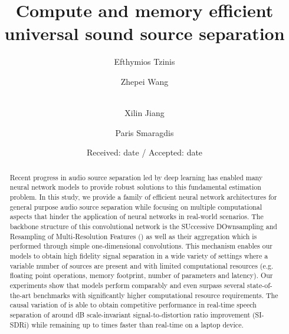\title{Compute and memory efficient universal sound source separation}




\author{Efthymios Tzinis \and Zhepei Wang \and \\ Xilin Jiang \and Paris Smaragdis 
}




\date{Received: date / Accepted: date}



\maketitle

\begin{abstract}
Recent progress in audio source separation led by deep learning has enabled many neural network models to provide robust solutions to this fundamental estimation problem. In this study, we provide a family of efficient neural network architectures for general purpose audio source separation while focusing on multiple computational aspects that hinder the application of neural networks in real-world scenarios. The backbone structure of this convolutional network is the SUccessive DOwnsampling and Resampling of Multi-Resolution Features (\sudodot) as well as their aggregation which is performed through simple one-dimensional convolutions. This mechanism enables our models to obtain high fidelity signal separation in a wide variety of settings where a variable number of sources are present and with limited computational resources (e.g. floating point operations, memory footprint, number of parameters and latency). Our experiments show that \sudo models perform comparably and even surpass several state-of-the-art benchmarks with significantly higher computational resource requirements. The causal variation of \sudo is able to obtain competitive performance in real-time speech separation of around dB scale-invariant signal-to-distortion ratio improvement (SI-SDRi) while remaining up to  times faster than real-time on a laptop device. 
\end{abstract}

